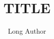 \documentclass[12pt]{jbeamer}
\institute[short institute]{long institute}
\subtitle{}
\title[short title]{{{{TITLE}}}}
\author[short author]{Long Author}
\begin{document}
\maketitle
\begin{frame}
\printbibliography
\end{frame}
\end{document}
